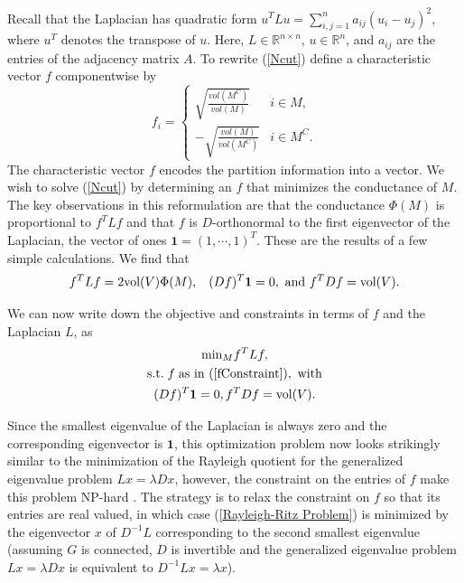 \documentclass[11pt]{article}
\begin{document}
Recall that the Laplacian has quadratic form $u^TLu = \sum_{i,j=1}^n a_{ij}(u_i-u_j)^2$, where $u^T$ denotes the transpose of $u$.  Here, $L\in\mathbb{R}^{n\times n}$, $u\in\mathbb{R}^n$, and $a_{ij}$ are the entries of the adjacency matrix $A$. To rewrite (\ref{Ncut}) define a characteristic vector $f$ componentwise by
\begin{equation}\label{fConstraint}
f_i = \begin{cases}
\sqrt{\frac{vol(M^C)}{vol(M)}} & i\in M, \\
-\sqrt{\frac{vol(M)}{vol(M^C)}} & i\in M^C.
\end{cases}
\end{equation}
The characteristic vector $f$ encodes the partition information into a vector. We wish to solve (\ref{Ncut}) by determining an $f$ that minimizes the conductance of $M$. The key observations in this reformulation are that the conductance $\Phi(M)$ is proportional to $f^TLf$ and that $f$ is $D$-orthonormal to the first eigenvector of the Laplacian, the vector of ones $\mathbf{1}=(1,\cdots, 1)^T$. These are the results of a few simple calculations. We find that
$$f^TLf = 2\text{vol}(V)\Phi(M),\hspace{3mm}
(Df)^T\mathbf{1} = 0, \text{ and } f^TDf =\text{vol}(V).$$

We can now write down the objective and constraints in terms of $f$ and the Laplacian $L$, as
\begin{equation}\label{Rayleigh-Ritz Problem}
\begin{gathered}
\text{min}_M f^TLf, \\
\text{s.t.}\hspace{1mm} f \hspace{1mm}\text{as in } (\ref{fConstraint}), \text{ with}\\
(Df)^T\mathbf{1}=0, f^TDf = \text{vol}(V).
\end{gathered}
\end{equation}


Since the smallest eigenvalue of the Laplacian is always zero and the corresponding eigenvector is $\mathbf{1}$, this optimization problem now looks strikingly similar to the minimization of the Rayleigh quotient for the generalized eigenvalue problem $Lx=\lambda Dx$, however, the constraint on the entries of $f$ make this problem NP-hard \cite{luxburg}. The strategy is to relax the constraint on $f$ so that its entries are real valued, in which case (\ref{Rayleigh-Ritz Problem}) is minimized by the eigenvector $x$ of $D^{-1}L$ corresponding to the second smallest eigenvalue (assuming $G$ is connected, $D$ is invertible and the generalized eigenvalue problem $Lx=\lambda Dx$ is equivalent to $D^{-1}Lx=\lambda x$).
\end{document}

